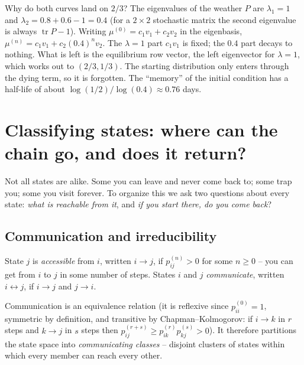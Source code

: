 \begin{happeningbox}
Why do both curves land on $2/3$? The eigenvalues of the weather $P$ are $\lambda_1 = 1$ and
$\lambda_2 = 0.8 + 0.6 - 1 = 0.4$ (for a $2\times2$ stochastic matrix the second eigenvalue is
always $\operatorname{tr}P - 1$). Writing $\mu^{(0)} = c_1 v_1 + c_2 v_2$ in the eigenbasis,
$\mu^{(n)} = c_1 v_1 + c_2 (0.4)^n v_2$. The $\lambda=1$ part $c_1 v_1$ is fixed; the $0.4$
part decays to nothing. What is left is the equilibrium row vector, the left eigenvector for
$\lambda = 1$, which works out to $(2/3, 1/3)$. The starting distribution only enters through
the dying term, so it is forgotten. The ``memory'' of the initial condition has a half-life of
about $\log(1/2)/\log(0.4) \approx 0.76$ days.
\end{happeningbox}

\section{Classifying states: where can the chain go, and does it return?}
\label{ch23:classification}

Not all states are alike. Some you can leave and never come back to; some trap you; some you
visit forever. To organize this we ask two questions about every state: \emph{what is
reachable from it}, and \emph{if you start there, do you come back}?

\subsection{Communication and irreducibility}

\begin{definition}
\label{ch23:def-communicate}
State $j$ is \emph{accessible} from $i$, written $i \to j$, if $p_{ij}^{(n)} > 0$ for some
$n \ge 0$ -- you can get from $i$ to $j$ in some number of steps. States $i$ and $j$
\emph{communicate}, written $i \leftrightarrow j$, if $i \to j$ and $j \to i$.
\end{definition}

Communication is an equivalence relation (it is reflexive since $p_{ii}^{(0)}=1$, symmetric by
definition, and transitive by Chapman--Kolmogorov: if $i \to k$ in $r$ steps and $k \to j$ in
$s$ steps then $p_{ij}^{(r+s)} \ge p_{ik}^{(r)}p_{kj}^{(s)} > 0$). It therefore partitions the
state space into \emph{communicating classes} -- disjoint clusters of states within which
every member can reach every other.

